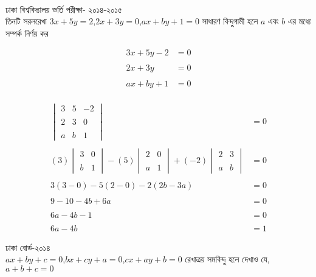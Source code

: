 \documentclass{article}
\begin{document}
\\
ঢাকা বিশ্ববিদ্যালয় ভর্তি পরীক্ষা- ২০১৪-২০১৫\\ 
তিনটি সরলরেখা $3x+5y=2$,\quad $2x+3y=0$,\quad $ax+by+1=0$ সাধারণ বিন্দুগামী হলে  $a$ এবং  $b$ এর মধ্যে সম্পর্ক নির্ণয় কর \\ 
\begin{multicols}{2}
	\begin{align*}
	3x+5y-2&=0\\
		\\
	2x+3y&=0\\
		\\
	ax+by+1&=0
	\end{align*}
	\\ 
	\begin{align*}
		\begin{vmatrix}
			3& 5&-2\\
			\\
			2 & 3 &0\\
			\\
			a& b &1
		\end{vmatrix}&=0\\
		\\
		(3)	\begin{vmatrix}
			3 &0\\
			\\
			b &1
		\end{vmatrix}-(5)	\begin{vmatrix}
			2 &0\\
			\\
			a &1
		\end{vmatrix}+(-2)	\begin{vmatrix}
			2 &3\\
			\\
			a &b
		\end{vmatrix}&=0\\
		\\
		3(3-0)-5(2-0)-2(2b-3a)&=0\\
		\\
		9-10-4b+6a&=0\\
		\\
		6a-4b-1&=0\\
		\\
		6a-4b&=1
	\end{align*}
\end{multicols}
ঢাকা বোর্ড-২০১৪\\ 
$ax+by+c=0$,\quad$bx+cy+a=0$,\quad $cx+ay+b=0$ রেখাত্রয় সমবিন্দু হলে দেখাও যে,  $a+b+c=0$\\ 
\\
\end{document}
